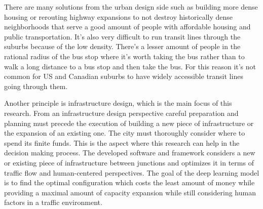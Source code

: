 \documentclass[
]{elteikthesis}[2023/04/10]
\begin{document}
There are many solutions from the urban design side such as building
more dense housing or rerouting highway expansions to not destroy
historically dense neighborhoods that serve a good amount of people
with affordable housing and public transportation. It's also very
difficult to run transit lines through the suburbs because of the
low density. There's a lesser amount of people in the rational radius
of the bus stop where it's worth taking the bus rather than to walk
a long distance to a bus stop and then take the bus. For this reason
it's not common for US and Canadian suburbs to have widely accessible
transit lines going through them. 

Another principle is infrastructure design, which is the main focus
of this research. From an infrastructure design perspective careful
preparation and planning must precede the execution of building a
new piece of infrastructure or the expansion of an existing one. The
city must thoroughly consider where to spend its finite funds. This
is the aspect where this research can help in the decision making
process. The developed software and framework considers a new or existing
piece of infrastructure between junctions and optimizes it in terms
of traffic flow and human-centered perspectives. The goal of the deep
learning model is to find the optimal configuration which costs the
least amount of money while providing a maximal amount of capacity
expansion while still considering human factors in a traffic environment. 
\end{document}
